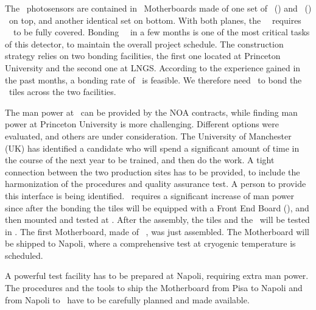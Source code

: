 The \DSps\ photosensors are contained in \DSpMBNumber\ Motherboards made of one set of \DSpSQBsNumber\  (\SQB) and \DSpTRBsNumber\  (\TRB) \DSkPdms\ on top, and another identical set on bottom.  With both planes, the \DSps\ \TPC\ requires \DSpPdmsNumber\ \DSkPdm\ to be fully covered. Bonding \DSpSipmsNumber\ \SiPMs\ in a few months is one of the most critical tasks of this detector, to maintain the overall project schedule. %
The construction strategy relies on two bonding facilities, the first one located at Princeton University and the second one at LNGS. According to the experience gained in the past months, a bonding rate of \DSpSipmsBondingRate\ is feasible.  We therefore need \DSpSipmsBondingTime\ to bond the \DSpPdmsNumber\ tiles across the two facilities.

The man power at \LNGS\ can be provided by the NOA contracts, while finding man power at Princeton University is more challenging. Different options were evaluated, and others are under consideration. The University of Manchester (UK) has identified a candidate who will spend a significant amount of time in the course of the next year to be trained, and then do the work.  A tight connection between the two production sites has to be provided, to include the harmonization of the procedures and quality assurance test. A person to provide this interface is being identified.  \LNGS\ requires a significant increase of man power since after the bonding the tiles will be equipped with a Front End Board (\FEB), and then mounted and tested at \LNGS. After the assembly, the tiles and the \FEB\ will be tested in \LIN.  The first Motherboard, made of \DSkSQBPdmsNumber\ \DSkPdms, was just assembled.  The Motherboard will be shipped to Napoli, where a comprehensive test at cryogenic temperature is scheduled.

A powerful test facility has to be prepared at Napoli, requiring extra man power. The procedures and the tools to ship the Motherboard from Pisa to Napoli and from Napoli to \CERN\ have to be carefully planned and made available. 


